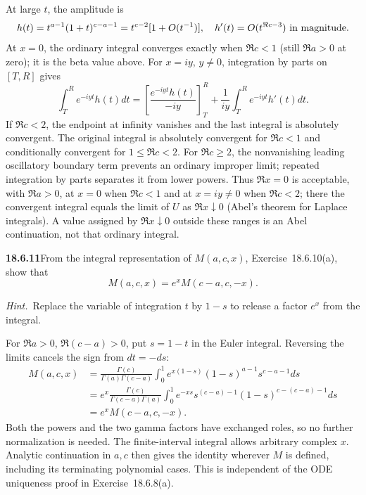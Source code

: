   At large $t$, the amplitude is
\[
h(t)=t^{a-1}(1+t)^{c-a-1}=t^{c-2}[1+O(t^{-1})],
\quad h'(t)=O(t^{\Re c-3})\ \hbox{in magnitude}.
\]
At $x=0$, the ordinary integral converges exactly when
$\Re c<1$ (still $\Re a>0$ at zero); it is the beta value above.
For $x=iy$, $y\ne0$, integration by parts on $[T,R]$ gives
\[
\int_T^R e^{-iyt}h(t)dt
 =\left[\frac{e^{-iyt}h(t)}{-iy}\right]_T^R
   +\frac1{iy}\int_T^R e^{-iyt}h'(t)dt.
\]
If $\Re c<2$, the endpoint at infinity vanishes and the last
integral is absolutely convergent.  The original integral is
absolutely convergent for $\Re c<1$ and conditionally convergent
for $1\le\Re c<2$.  For $\Re c\ge2$, the nonvanishing leading
oscillatory boundary term prevents an ordinary improper limit;
repeated integration by parts separates it from lower powers.
Thus $\Re x=0$ is acceptable, with $\Re a>0$, at $x=0$ when
$\Re c<1$ and at $x=iy\ne0$ when $\Re c<2$; there the convergent
integral equals the limit of $U$ as $\Re x\downarrow0$ (Abel's
theorem for Laplace integrals).
A value assigned by $\Re x\downarrow0$ outside these ranges is
an Abel continuation, not that ordinary integral.

\par\bigskip
\noindent\textbf{18.6.11}\quad From the integral representation of
$M(a,c,x)$, Exercise~18.6.10(a), show that
\[
M(a,c,x)=e^{x}M(c-a,c,-x).
\]
\par\emph{Hint.}~Replace the variable of integration $t$ by $1-s$
to release a factor $e^{x}$ from the integral.
\par\nobreak
\solution
For $\Re a>0$, $\Re(c-a)>0$, put $s=1-t$ in the Euler
integral.  Reversing the limits cancels the sign from $dt=-ds$:
\begin{align*}
M(a,c,x)
 &=\frac{\Gamma(c)}{\Gamma(a)\Gamma(c-a)}
   \int_0^1e^{x(1-s)}(1-s)^{a-1}s^{c-a-1}ds\\
 &=e^x\frac{\Gamma(c)}{\Gamma(c-a)\Gamma(a)}
   \int_0^1e^{-xs}s^{(c-a)-1}(1-s)^{c-(c-a)-1}ds\\
 &=\boxed{e^xM(c-a,c,-x)}.
\end{align*}
Both the powers and the two gamma factors have exchanged roles,
so no further normalization is needed.  The finite-interval integral
allows arbitrary complex $x$.  Analytic continuation in $a,c$
then gives the identity wherever $M$ is defined, including its
terminating polynomial cases.  This is independent of the ODE
uniqueness proof in Exercise~18.6.8(a).

